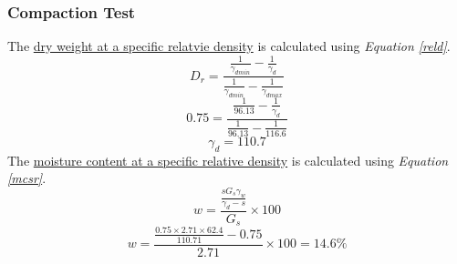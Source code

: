 \documentclass{article}
\begin{document}
\subsubsection{Compaction Test}
\noindent The \underline{dry weight at a specific relatvie density} is calculated using \emph{Equation \ref{reld}}. 
\begin{equation}\label{reld}D_r=\frac{\frac{1}{\gamma_{d min}}-\frac{1}{\gamma_{d}}}{\frac{1}{\gamma_{d min}}-\frac{1}{\gamma_{d max}}}\end{equation}
\[0.75=\frac{\frac{1}{96.13}-\frac{1}{\gamma_{d}}}{\frac{1}{96.13}-\frac{1}{116.6}}\]
\[\gamma_d = \boxed{110.7}\]
\noindent The \underline{moisture content at a specific relative density} is calculated using \emph{Equation \ref{mcsr}}.
\begin{equation}\label{mcsr}w=\frac{\frac{sG_s\gamma_w}{\gamma_d-s}}{G_s}\times 100\end{equation}
\[w=\frac{\frac{0.75\times 2.71\times 62.4}{110.71}-0.75}{2.71}\times 100=\boxed{14.6\%}\]
\end{document}
